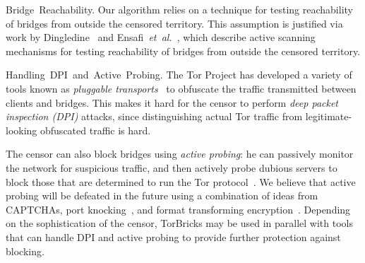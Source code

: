 \documentclass[USenglish,oneside,twocolumn]{article}
\newcommand{\etal}{\textit{et~al.}}
\newcommand{\bricks}{}
\def\bricks/{\textsf{\sfsize \mbox{TorBricks}}}
\newcommand{\sfsize}{\fontsize{0.68\baselineskip}{0.68\baselineskip}\selectfont}
\newcommand{\sans}[1]{\textsf{\sfsize \mbox{#1}}}
\newcommand{\para}[1]{\vspace{0.85em} \noindent \sans{{\mbox{#1}}}}
\begin{document}
\para{Bridge Reachability.} Our algorithm relies on a technique for testing reachability of bridges from outside the censored territory. This assumption is justified via work by Dingledine~\cite{Dingledine:BridgeReach:2011} and Ensafi~\etal~\cite{Ensafi:2014:PAM}, which describe active scanning mechanisms for testing reachability of bridges from outside the censored territory. %

\para{Handling DPI and Active Probing.} The Tor Project has developed a variety of tools known as \emph{pluggable transports}~\cite{Tor:PluggableTransport} to obfuscate the traffic transmitted between clients and bridges. This makes it hard for the censor to perform \emph{deep packet inspection (DPI)} attacks, since distinguishing actual Tor traffic from legitimate-looking obfuscated traffic is hard.

The censor can also block bridges using \emph{active probing}: he can passively monitor the network for suspicious traffic, and then actively probe dubious servers to block those that are determined to run the Tor protocol~\cite{Ensafi2015b}.
We believe that active probing will be defeated in the future using a combination of ideas from CAPTCHAs, port knocking~\cite{PortKnocking2003}, and format transforming encryption~\cite{Dyer:2013:PMM:2508859.2516657}.
Depending on the sophistication of the censor, \bricks/ may be used in parallel with tools that can handle DPI and active probing to provide further protection against blocking.


\end{document}
